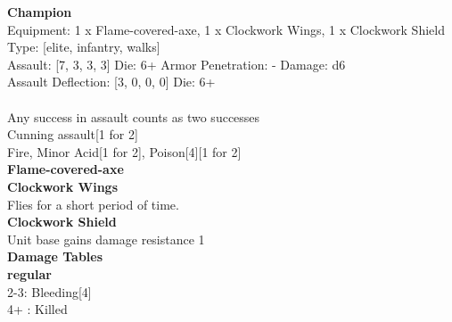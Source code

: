 {\bf Champion } \\
Equipment: 1 x Flame-covered-axe, 1 x Clockwork Wings, 1 x Clockwork Shield \\
Type: [elite, infantry, walks] \\

Assault: [7, 3, 3, 3] Die: 6+ Armor Penetration: - Damage: d6 \\
Assault Deflection: [3, 0, 0, 0] Die: 6+\\
\\
Any success in assault counts as two successes \\
Cunning assault[1 for 2]\\ 
Fire, Minor Acid[1 for 2], Poison[4][1 for 2]\\ 

{\bf Flame-covered-axe } \\

{\bf Clockwork Wings } \\

Flies for a short period of time.\\ 

{\bf Clockwork Shield } \\

Unit base gains damage resistance 1\\ 





 





{\bf Damage Tables} \\
 {\bf regular } \\
2-3: Bleeding[4] \\
4+ : Killed \\










\pagebreak
